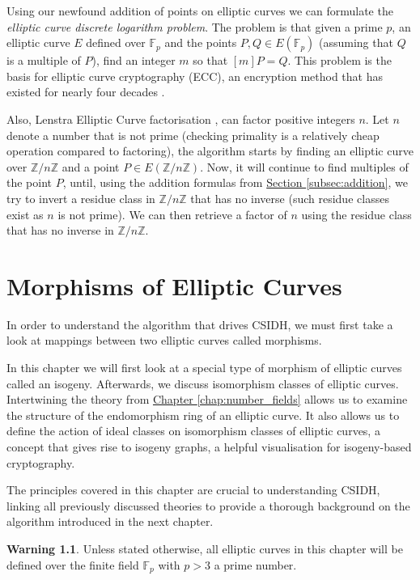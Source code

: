 \documentclass[openany, a4paper, 10pt]{book}
\theoremstyle{plain}
\theoremstyle{plain}
\theoremstyle{plain}
\theoremstyle{definition}
\theoremstyle{plain}
\theoremstyle{definition}
\newtheorem*{warning}{Warning}
\theoremstyle{remark}
\newcommand{\secref}[1]{\hyperref[#1]{Section \ref{#1}}}
\newcommand{\chapref}[1]{\hyperref[#1]{Chapter \ref{#1}}}
\begin{document}
Using our newfound addition of points on elliptic curves we can formulate the \textit{elliptic curve discrete logarithm problem}.
The problem is that given a prime $p$, an elliptic curve $E$ defined over $\mathbb F_p$ and the points $P,Q \in E(\mathbb F_p)$ (assuming that $Q$ is a multiple of $P$), find an integer $m$ so that $[m]P=Q$.
This problem is the basis for elliptic curve cryptography (ECC), an encryption method that has existed for nearly four decades \cite{miller} \cite{koblitz}.

Also, Lenstra Elliptic Curve factorisation \cite[Section~4.4]{silverman} \cite{ecm}, can factor positive integers $n$.
Let $n$ denote a number that is not prime (checking primality is a relatively cheap operation compared to factoring), the algorithm starts by finding an elliptic curve over $\mathbb Z/n\mathbb Z$ and a point $P \in E(\mathbb Z / n \mathbb Z)$.
Now, it will continue to find multiples of the point $P$, until, using the addition formulas from \secref{subsec:addition}, we try to invert a residue class in $\mathbb Z/n \mathbb Z$ that has no inverse (such residue classes exist as $n$ is not prime).
We can then retrieve a factor of $n$ using the residue class that has no inverse in $\mathbb Z/n \mathbb Z$.


\chapter{Morphisms of Elliptic Curves}\label{chap:morphisms}
In order to understand the algorithm that drives CSIDH, we must first take a look at mappings between two elliptic curves called morphisms.

In this chapter we will first look at a special type of morphism of elliptic curves called an isogeny.
Afterwards, we discuss isomorphism classes of elliptic curves.
Intertwining the theory from \chapref{chap:number_fields} allows us to examine the structure of the endomorphism ring of an elliptic curve.
It also allows us to define the action of ideal classes on isomorphism classes of elliptic curves, a concept that gives rise to isogeny graphs, a helpful visualisation for isogeny-based cryptography.

The principles covered in this chapter are crucial to understanding CSIDH, linking all previously discussed theories to provide a thorough background on the algorithm introduced in the next chapter.

\begin{warning}
    Unless stated otherwise, all elliptic curves in this chapter will be defined over the finite field $\mathbb F_p$ with $p > 3$ a prime number.
\end{warning}
\end{document}
